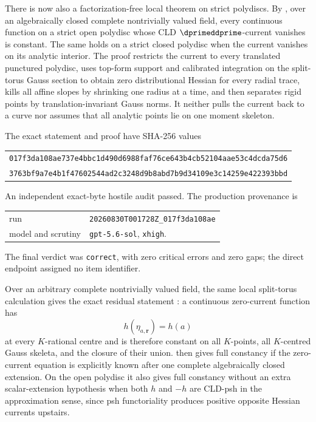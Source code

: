 There is now also a factorization-free local theorem on strict polydiscs.
By , over an algebraically
closed complete nontrivially valued field, every continuous function on a
strict open polydisc whose CLD \(\dprimeddprime\)-current vanishes is
constant.  The same holds on a strict closed polydisc when the current
vanishes on its analytic interior.  The proof restricts the current to every
translated punctured polydisc, uses top-form support and calibrated
integration on the split-torus Gauss section to obtain zero distributional
Hessian for every radial trace, kills all affine slopes by shrinking one
radius at a time, and then separates rigid points by translation-invariant
Gauss norms.  It neither pulls the current back to a curve nor assumes that
all analytic points lie on one moment skeleton.

The exact statement and proof have SHA-256 values
\begin{center}
\small
\begin{tabular}{@{}c@{}}
\nolinkurl{017f3da108ae737e4bbc1d490d6988faf76ce643b4cb52104aae53c4dcda75d6}\\
\nolinkurl{3763bf9a7e4b1f47602544ad2c3248d9b8abd7b9d34109e3c14259e422393bbd}
\end{tabular}
\end{center}
An independent exact-byte hostile audit passed.  The production provenance
is
\begin{center}
\small
\begin{tabular}{@{}ll@{}}
run & \nolinkurl{20260830T001728Z_017f3da108ae}\\
model and scrutiny & \texttt{gpt-5.6-sol}, \texttt{xhigh}.
\end{tabular}
\end{center}
The final verdict was \texttt{correct}, with zero critical errors and zero
gaps; the direct endpoint assigned no item identifier.

Over an arbitrary complete nontrivially valued field, the same local
split-torus calculation gives the exact residual statement
: a continuous zero-current function
has
\[
                         h(\eta_{a,\mathbf r})=h(a)
\]
at every \(K\)-rational centre and is therefore constant on all
\(K\)-points, all \(K\)-centred Gauss skeleta, and the closure of their
union.   then gives full constancy if
the zero-current equation is explicitly known after one complete
algebraically closed extension.  On the open polydisc it also gives full
constancy without an extra scalar-extension hypothesis when both \(h\) and
\(-h\) are CLD-psh in the approximation sense, since psh functoriality
produces positive opposite Hessian currents upstairs.

